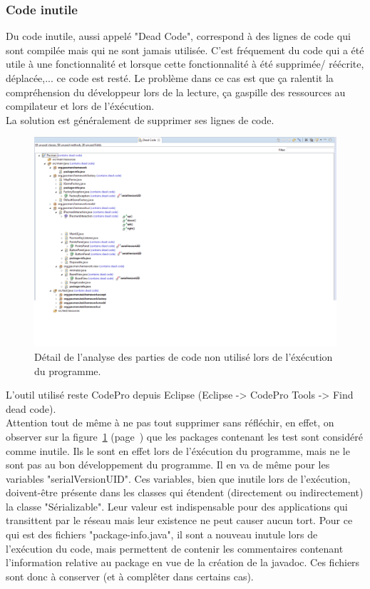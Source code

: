 \documentclass[12pt,a4paper,final]{article}
\newcommand{\labelfigure}[1]{figure~\ref{#1} (page~\pageref{#1})}
\begin{document}
\subsubsection{Code inutile}\label{deadCode}
Du code inutile, aussi appelé "Dead Code", correspond à des lignes de code qui sont compilée mais qui ne sont jamais utilisée. 
C'est fréquement du code qui a été utile à une fonctionnalité et lorsque cette fonctionnalité à été supprimée/ réécrite, déplacée,... ce code est resté. Le problème dans ce cas est que ça ralentit la compréhension du développeur lors de la lecture, ça gaspille des ressources au compilateur et lors de l'éxécution.\\
La solution est généralement de supprimer ses lignes de code.
\begin{figure}[!h]
	\centering
	\includegraphics[width=\textwidth]{DeadCode.png}
	\caption{\label{deadcode}Détail de l'analyse des parties de code non utilisé lors de l'éxécution du programme.}
\end{figure}
L'outil utilisé reste CodePro depuis Eclipse (Eclipse -> CodePro Tools -> Find dead code).\\
Attention tout de même à ne pas tout supprimer sans réfléchir, en effet, on observer sur la \labelfigure{deadcode} que les packages contenant les test sont considéré comme inutile. Ils le sont en effet lors de l'éxécution du programme, mais ne le sont pas au bon développement du programme. Il en va de même pour les variables "serialVersionUID". Ces variables, bien que inutile lors de l'exécution, doivent-être présente dans les classes qui étendent (directement ou indirectement) la classe "Sérializable". Leur valeur est indispensable pour des applications qui transittent par le réseau mais leur existence ne peut causer aucun tort. Pour ce qui est des fichiers "package-info.java", il sont a nouveau inutule lors de l'exécution du code, mais permettent de contenir les commentaires contenant l'information relative au package en vue de la création de la javadoc. Ces fichiers sont donc à conserver (et à complêter dans certains cas).\\
\end{document}
